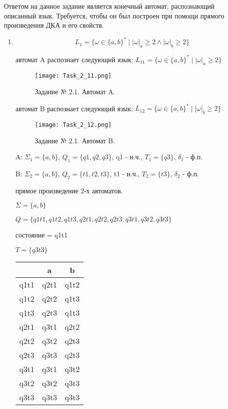 \documentclass[a4paper, 12pt]{article}
\begin{document}
Ответом на данное задание является конечный автомат, распознающий описанный язык. Требуется, чтобы он был построен при помощи прямого произведения ДКА и его свойств.

\begin{enumerate}

\item$$ L_1 = \{\omega \in \{a, b\}^* \mid |\omega|_a \geq 2 \wedge |\omega|_b \geq 2 \} $$

 автомат A распознает следующий язык: $ L_{11} = \{\omega \in \{a, b\}^* \mid |\omega|_a \geq 2 \} $
\begin{figure}[!h]
\centering
\texttt{[image: Task\_2\_11.png]}
\caption{Задание № 2.1. Автомат A.}
\end{figure}

 автомат B распознает следующий язык: $ L_{12} = \{\omega \in \{a, b\}^* \mid |\omega|_b \geq 2 \} $
\begin{figure}[!h]
\centering
\texttt{[image: Task\_2\_12.png]}
\caption{Задание № 2.1. Автомат B.}
\end{figure}

 A: $ \Sigma_1 = \{a, b\}$, $ Q_1 = \{q1, q2, q3 \} $, q1 - н.ч., $ T_1 = \{q3 \} $, $ \delta_1 $ - ф.п.

 B: $ \Sigma_2 = \{a, b\}$, $ Q_2 = \{t1, t2, t3 \} $, t1 - н.ч., $ T_2 = \{t3 \} $, $ \delta_2 $ - ф.п.

 прямое произведение 2-х автоматов.

\noindent$ \Sigma = \{a, b\}$

\noindent$ Q = \{q1t1, q1t2, q1t3, q2t1, q2t2, q2t3, q3t1, q3t2, q3t3 \} $

 состояние = q1t1

\noindent$ T = \{q3t3 \} $

\begin{center}
\begin{tabular}{ |c|c|c| } 
\hline
\, & a & b \\
\hline
 q1t1 & q2t1 & q1t2 \\
\hline
q1t2 & q2t2 & q1t3 \\
\hline
q1t3& q2t3 & q1t3 \\
\hline
q2t1 & q3t1 & q2t2 \\
\hline
q2t2 & q3t2 & q2t3 \\
\hline
q2t3 & q3t3 & q2t3 \\
\hline
q3t1 & q3t1 & q3t2 \\
\hline
q3t2 & q3t2 & q3t3 \\
\hline
q3t3 & q3t3 & q3t3 \\
\hline
\end{tabular}
\end{center}


\end{enumerate}
\end{document}
